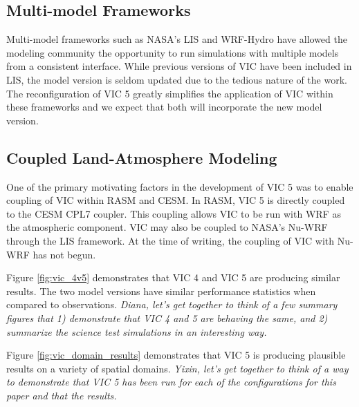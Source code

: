 \documentclass[gmd, manuscript]{copernicus}
\begin{document}
  \subsection{Multi-model Frameworks}
    \label{sec:multimodel}
    Multi-model frameworks such as NASA's LIS \citep{Kumar_2006} and WRF-Hydro \citep{Gochis_2013} have allowed the modeling community the opportunity to run simulations with multiple models from a consistent interface.
    While previous versions of VIC have been included in LIS, the model version is seldom updated due to the tedious nature of the work.
    The reconfiguration of VIC 5 greatly simplifies the application of VIC within these frameworks and we expect that both will incorporate the new model version.

  \subsection{Coupled Land-Atmosphere Modeling}
    \label{sec:coupled_apps}
    One of the primary motivating factors in the development of VIC 5 was to enable coupling of VIC within RASM and CESM.
    In RASM, VIC 5 is directly coupled to the CESM CPL7 coupler.
    This coupling allows VIC to be run with WRF as the atmospheric component.
    VIC may also be coupled to NASA's Nu-WRF through the LIS framework.
    At the time of writing, the coupling of VIC with Nu-WRF has not begun.


  Figure \ref{fig:vic_4v5} demonstrates that VIC 4 and VIC 5 are producing similar results.
  The two model versions have similar performance statistics when compared to observations.
  \textit{Diana, let's get together to think of a few summary figures that 1) demonstrate that VIC 4 and 5 are behaving the same, and 2) summarize the science test simulations in an interesting way.}

  Figure \ref{fig:vic_domain_results} demonstrates that VIC 5 is producing plausible results on a variety of spatial domains.
  \textit{Yixin, let's get together to think of a way to demonstrate that VIC 5 has been run for each of the configurations for this paper and that the results.}
\end{document}
